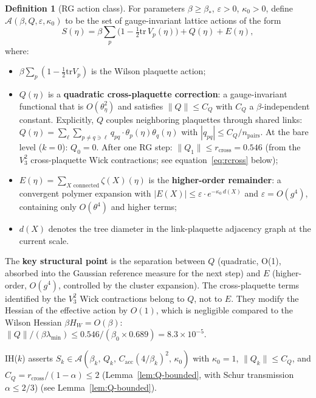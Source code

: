 \documentclass[11pt]{article}
\theoremstyle{definition}
\newtheorem{definition}[theorem]{Definition}
\newcommand{\tr}{\mathrm{tr}}
\begin{document}
\begin{definition}[RG action class]\label{def:action-class}
For parameters $\beta\ge\beta_*$, $\varepsilon>0$, $\kappa_0>0$,
define $\mathcal{A}(\beta,Q,\varepsilon,\kappa_0)$ to be the set of
gauge-invariant lattice actions of the form
\begin{equation}\label{eq:action-class}
S(\eta)=\beta\sum_p\bigl(1-\tfrac{1}{2}\tr\,V_p(\eta)\bigr)
+Q(\eta)+E(\eta),
\end{equation}
where:
\begin{itemize}[nosep]
\item $\beta\sum_p(1-\frac{1}{2}\tr V_p)$ is the Wilson plaquette action;
\item $Q(\eta)$ is a \textbf{quadratic cross-plaquette correction}:
a gauge-invariant functional that is $O(\theta_\eta^2)$ and satisfies
$\|Q\|\le C_Q$ with $C_Q$ a $\beta$-independent constant.
Explicitly, $Q$ couples neighboring plaquettes through
shared links: $Q(\eta)=\sum_{\ell}\sum_{p\ne q\ni\ell}
q_{pq}\cdot\theta_p(\eta)\theta_q(\eta)$ with
$|q_{pq}|\le C_Q/n_{\mathrm{pairs}}$.
At the bare level ($k=0$): $Q_0=0$.
After one RG step: $\|Q_1\|\le r_{\mathrm{cross}}=0.546$
(from the $V_3^2$ cross-plaquette Wick contractions;
see equation~\eqref{eq:rcross} below);
\item $E(\eta)=\sum_{X\text{ connected}}\zeta(X)(\eta)$ is the
\textbf{higher-order remainder}: a convergent
polymer expansion with $|E(X)|\le\varepsilon\cdot e^{-\kappa_0\,d(X)}$
and $\varepsilon=O(g^4)$, containing only $O(\theta^4)$ and higher terms;
\item $d(X)$ denotes the tree diameter in the link-plaquette
adjacency graph at the current scale.
\end{itemize}

The \textbf{key structural point} is the separation between $Q$
(quadratic, O(1), absorbed into the Gaussian reference measure for
the next step) and $E$ (higher-order, $O(g^4)$, controlled by the
cluster expansion).  The cross-plaquette terms identified by the
$V_3^2$ Wick contractions belong to $Q$, not to $E$.
They modify the Hessian of the effective action by $O(1)$,
which is negligible compared to the Wilson Hessian $\beta H_W=O(\beta)$:
$\|Q\|/(\beta\lambda_{\min})\le 0.546/(\beta_0\times 0.689)
=8.3\times 10^{-5}$.

IH($k$) asserts $S_k\in\mathcal{A}(\beta_k,\,Q_k,\,
C_{\mathrm{acc}}(4/\beta_k)^2,\,\kappa_0)$ with $\kappa_0=1$,
$\|Q_k\|\le C_Q$, and $C_Q=r_{\mathrm{cross}}/(1-\alpha)\le 2$
(Lemma~\ref{lem:Q-bounded}, with Schur transmission
$\alpha\le 2/3$) (see Lemma~\ref{lem:Q-bounded}).


\end{definition}
\end{document}

